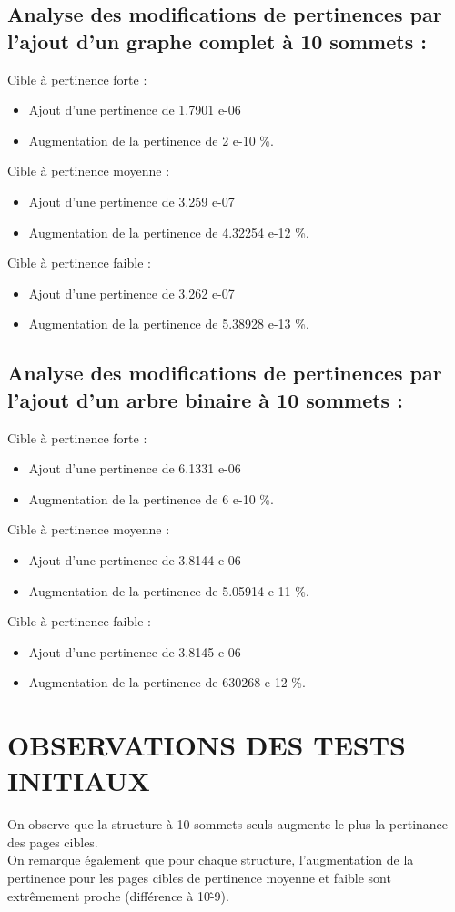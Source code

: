 \documentclass[a4paper,11pt]{article}
\begin{document}
	\subsection{Analyse des modifications de pertinences par l'ajout d'un graphe complet à 10 sommets :}
		Cible à pertinence forte :
		\begin{itemize} 	
			\item Ajout d'une pertinence de 1.7901 e-06
			\item Augmentation de la pertinence de 2 e-10 \%.
		\end{itemize}
		Cible à pertinence moyenne :
		\begin{itemize} 	
			\item Ajout d'une pertinence de 3.259 e-07
			\item Augmentation de la pertinence de 4.32254 e-12 \%.
		\end{itemize}
		Cible à pertinence faible :
		\begin{itemize} 	
			\item Ajout d'une pertinence de 3.262 e-07
			\item Augmentation de la pertinence de 5.38928 e-13 \%.
		\end{itemize}

		\subsection{Analyse des modifications de pertinences par l'ajout d'un arbre binaire à 10 sommets :}
		Cible à pertinence forte :
		\begin{itemize} 	
			\item Ajout d'une pertinence de 6.1331 e-06
			\item Augmentation de la pertinence de 6 e-10 \%.
		\end{itemize}
		Cible à pertinence moyenne :
		\begin{itemize} 	
			\item Ajout d'une pertinence de 3.8144 e-06
			\item Augmentation de la pertinence de 5.05914 e-11 \%.
		\end{itemize}
		Cible à pertinence faible :
		\begin{itemize} 	
			\item Ajout d'une pertinence de 3.8145 e-06
			\item Augmentation de la pertinence de 630268 e-12 \%.
		\end{itemize}

	\section{OBSERVATIONS DES TESTS INITIAUX}
		On observe que la structure à 10 sommets seuls augmente le plus la pertinance des pages cibles.\\
		On remarque également que pour chaque structure, l'augmentation de la pertinence pour les pages cibles de pertinence moyenne et faible sont extrêmement proche (différence à 10\^-9).\\
\end{document}
